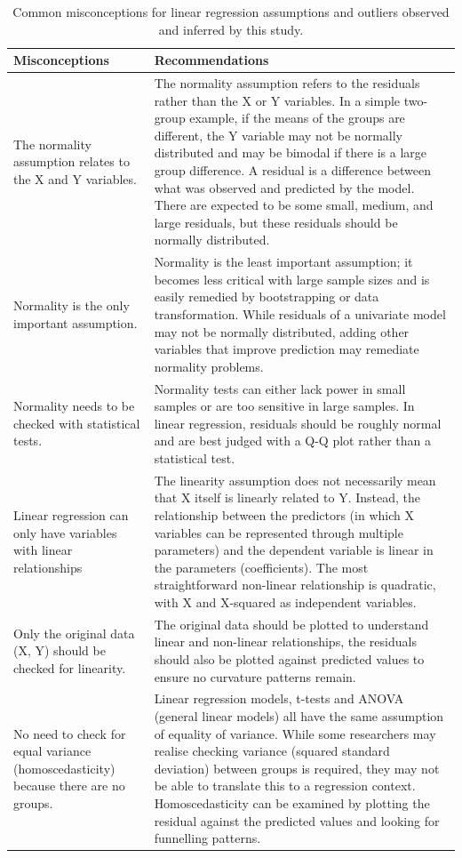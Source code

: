 \begin{table}[H]
\begin{widestuff}
\caption{Common misconceptions for linear regression assumptions and outliers observed and inferred by this study.} 
\begin{tabular}{p{5cm}p{13cm}}
  \toprule
{\bf Misconceptions} & {\bf Recommendations} \\ 
  \midrule
The normality assumption relates to the X and Y variables. & The normality assumption refers to the residuals rather than the X or Y variables.  In a simple two-group example, if the means of the groups are different, the Y variable may not be normally distributed and may be bimodal if there is a large group difference. A residual is a difference between what was observed and predicted by the model. There are expected to be some small, medium, and large residuals, but these residuals should be normally distributed. \\ 
  Normality is the only important assumption. & Normality is the least important assumption; it becomes less critical with large sample sizes and is easily remedied by bootstrapping or data transformation.  While residuals of a univariate model may not be normally distributed, adding other variables that improve prediction may remediate normality problems. \\ 
  Normality needs to be checked with statistical tests. & Normality tests can either lack power in small samples or are too sensitive in large samples. In linear regression, residuals should be roughly normal and are best judged with a Q-Q plot rather than a statistical test. \\ 
  Linear regression can only have variables with linear relationships & The linearity assumption does not necessarily mean that X itself is linearly related to Y. Instead, the relationship between the predictors (in which X variables can be represented through multiple parameters) and the dependent variable is linear in the parameters (coefficients). The most straightforward non-linear relationship is quadratic, with X and X-squared as independent variables. \\ 
  Only the original data (X, Y) should be checked for linearity. & The original data should be plotted to understand linear and non-linear relationships, the residuals should also be plotted against predicted values to ensure no curvature patterns remain. \\ 
  No need to check for equal variance (homoscedasticity) because there are no groups. & Linear regression models, t-tests and ANOVA (general linear models) all have the same assumption of equality of variance. While some researchers may realise checking variance (squared standard deviation) between groups is required, they may not be able to translate this to a regression context. Homoscedasticity can be examined by plotting the residual against the predicted values and looking for funnelling patterns. \\ 

\end{tabular}
\end{widestuff}
\end{table}
